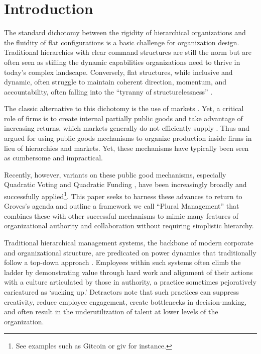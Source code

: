 \documentclass{article}
\begin{document}
\section{Introduction}
The standard dichotomy between the rigidity of hierarchical organizations and the fluidity of flat configurations is a basic challenge for organization design. Traditional hierarchies with clear command structures are still the norm but are often seen as stifling the dynamic capabilities organizations need to thrive in today's complex landscape. Conversely, flat structures, while inclusive and dynamic, often struggle to maintain coherent direction, momentum, and accountability, often falling into the ``tyranny of structurelessness'' \cite{ostrom2011private}.

The classic alternative to this dichotomy is the use of markets \cite{hamel2020humanocracy,coase1995nature}. Yet, a critical role of firms is to create internal partially public goods and take advantage of increasing returns, which markets generally do not efficiently supply \cite{samuelson1995diagrammatic}. Thus \cite{groves1973incentives} and \cite{groves1979incentives} argued for using public goods mechanisms to organize production inside firms in lieu of hierarchies and markets. Yet, these mechanisms have typically been seen as cumbersome and impractical.

Recently, however, variants on these public good mechanisms, especially Quadratic Voting \cite{lalley2016quadratic} and Quadratic Funding \cite{buterin2019flexible}, have been increasingly broadly and successfully applied\footnote{See examples such as Gitcoin or giv for instance.}. This paper seeks to harness these advances to return to Groves's agenda and outline a framework we call ``Plural Management'' that combines these with other successful mechanisms to mimic many features of organizational authority and collaboration without requiring simplistic hierarchy.

Traditional hierarchical management systems, the backbone of modern corporate and organizational structure, are predicated on power dynamics that traditionally follow a top-down approach \cite{drucker1974political}. Employees within such systems often climb the ladder by demonstrating value through hard work and alignment of their actions with a culture articulated by those in authority, a practice sometimes pejoratively caricatured as `sucking up.' Detractors note that such practices can suppress creativity, reduce employee engagement, create bottlenecks in decision-making, and often result in the underutilization of talent at lower levels of the organization.
\end{document}
